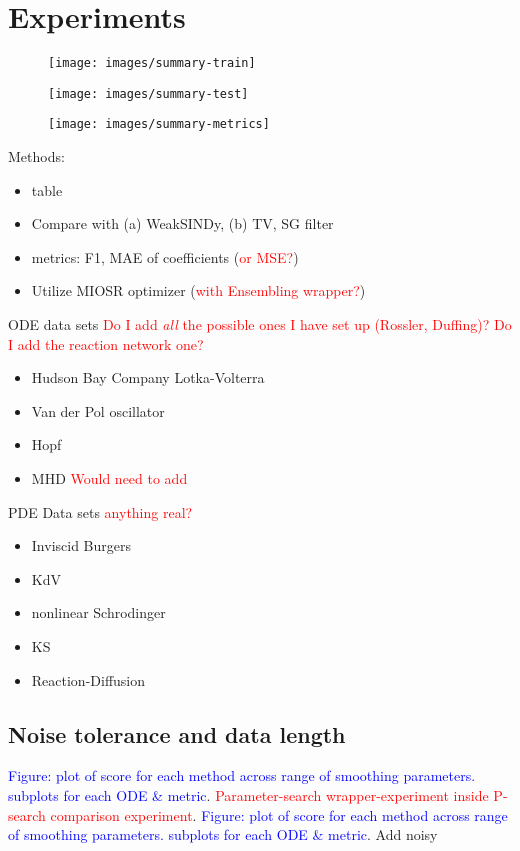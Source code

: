\documentclass{article}
\begin{document}
\section{Experiments}
\begin{figure}
    \texttt{[image: images/summary-train]}
\end{figure}
\begin{figure}
    \texttt{[image: images/summary-test]}
\end{figure}
\begin{figure}
    \texttt{[image: images/summary-metrics]}
\end{figure}
Methods:
\begin{itemize}
    \item table
    \item Compare with (a) WeakSINDy, (b) TV, SG filter
    \item metrics: F1, MAE of coefficients (\textcolor{red}{or MSE?})
    \item Utilize MIOSR optimizer (\textcolor{red}{with Ensembling wrapper?})
\end{itemize}
ODE data sets \textcolor{red}{Do I add {\it all} the possible ones I have set up (Rossler, Duffing)?  Do I add the reaction network one?}
\begin{itemize}
    \item Hudson Bay Company Lotka-Volterra
    \item Van der Pol oscillator
    \item Hopf
    \item MHD \textcolor{red}{Would need to add}
\end{itemize}
PDE Data sets \textcolor{red}{anything real?}
\begin{itemize}
    \item Inviscid Burgers
    \item KdV
    \item nonlinear Schrodinger
    \item KS
    \item Reaction-Diffusion
\end{itemize}

\subsection{Noise tolerance and data length}
\textcolor{blue}{Figure: plot of score for each method across range of smoothing parameters.  subplots for each ODE \& metric}.  \textcolor{red}{Parameter-search wrapper-experiment inside P-search comparison experiment}.
\textcolor{blue}{Figure: plot of score for each method across range of smoothing parameters.  subplots for each ODE \& metric}. 
Add noisy 
\end{document}
